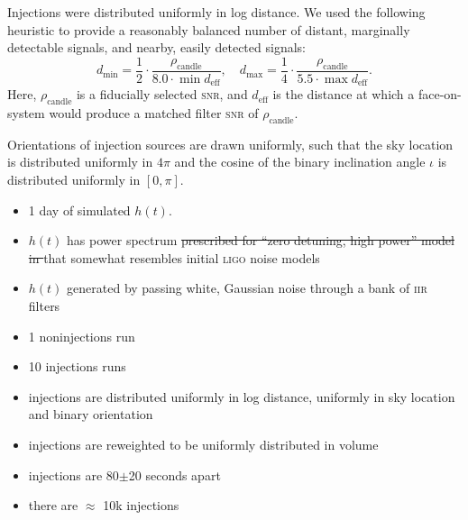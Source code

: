 Injections were distributed uniformly in log distance.  We used the following heuristic to provide a reasonably balanced number of distant, marginally detectable signals, and nearby, easily detected signals:
$$
d_\mathrm{min} = \frac{1}{2} \cdot \frac{\rho_\mathrm{candle}}{8.0 \cdot \min {d_\mathrm{eff}}}, \quad
d_\mathrm{max} = \frac{1}{4} \cdot \frac{\rho_\mathrm{candle}}{5.5 \cdot \max {d_\mathrm{eff}}}.
$$
Here, $\rho_\mathrm{candle}$ is a fiducially selected \textsc{snr}, and $d_\mathrm{eff}$ is the distance at which a face-on-system would produce a matched filter \textsc{snr} of $\rho_\mathrm{candle}$.

Orientations of injection sources are drawn uniformly, such that the sky location is distributed uniformly in $4\pi$ and the cosine of the binary inclination angle $\iota$ is distributed uniformly in $[0, \pi]$.

\begin{itemize}
\item 1 day of simulated $h(t)$.
\item $h(t)$ has power spectrum \sout{prescribed for ``zero detuning, high power'' model in \cite{Shoemaker:2009p9770}} that somewhat resembles initial \textsc{ligo} noise models
\item $h(t)$ generated by passing white, Gaussian noise through a bank of \textsc{iir} filters
\item 1 noninjections run
\item 10 injections runs
\item injections are distributed uniformly in log distance, uniformly in sky location and binary orientation
\item injections are reweighted to be uniformly distributed in volume
\item injections are 80$\pm$20 seconds apart
\item there are $\approx$ 10k injections
\end{itemize}

